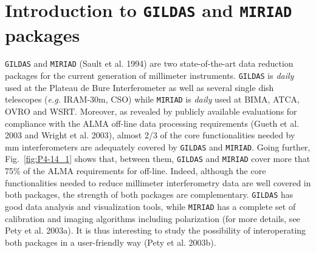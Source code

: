 \documentclass[11pt,twoside]{article}  %
\newcommand{\GILDAS}{\texttt{GILDAS}}
\newcommand{\MIRIAD}{\texttt{MIRIAD}}
\newcommand{\ALMA}{\textrm{ALMA}}
\newcommand{\IRAMthm}{\textrm{IRAM-30m}}
\newcommand{\CSO}{\textrm{CSO}}
\newcommand{\eg} {{\em e.g.}}
\begin{document}
%
%

\section{Introduction to \GILDAS{} and \MIRIAD{} packages}

\GILDAS{} and \MIRIAD{} (Sault et al. 1994)
are two state-of-the-art data reduction packages
for the current generation of millimeter instruments. \GILDAS{} is
\emph{daily} used at the Plateau de Bure Interferometer as well as several
single dish telescopes (\eg{} \IRAMthm{}, \CSO{}) while \MIRIAD{} is
\emph{daily} used at BIMA, ATCA, OVRO and WSRT. Moreover, as revealed by
publicly available evaluations for compliance with the \ALMA{} off-line
data processing requirements (Gueth et al. 2003 and Wright et al. 2003),
almost 2/3 of the core functionalities needed by mm interferometers are
adequately covered by \GILDAS{} and \MIRIAD{}.  Going further,
Fig.~\ref{fig:P4-14_1} shows that, between them, \GILDAS{} and \MIRIAD{}
cover more that 75\% of the \ALMA{} requirements for off-line.  Indeed,
although the core functionalities needed to reduce millimeter
interferometry data are well covered in both packages, the strength of both
packages are complementary. \GILDAS{} has good data analysis and
visualization tools, while \MIRIAD{} has a complete set of calibration and
imaging algorithms including polarization (for more details, see Pety et
al. 2003a). It is thus interesting to study the possibility of
interoperating both packages in a user-friendly way (Pety et al. 2003b).
\end{document}
